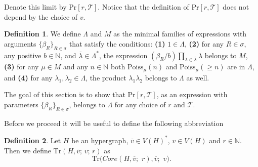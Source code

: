 \documentclass[12pt,notitlepage,a4paper]{article}
\theoremstyle{definition}
\newtheorem{definition}{Definition}[section]
\newcommand{\N}{\mathbb{N}}
\begin{document}
Denote this limit by $\mathrm{Pr}[r,\mathcal{T}]$. Notice that the 
definition of  $\mathrm{Pr}[r,\mathcal{T}]$ does not depend by the
choice of $v$.\par

\begin{definition} \label{def:treeprobabilies}
We define $\Lambda$ and $M$ as the minimal families
of expressions with arguments $\{\beta_R\}_{R\in\sigma}$
that satisfy the conditions: \textbf{(1)}
$1\in \Lambda$, \textbf{(2)} 
for any $R\in \sigma$, any positive $b\in \N$,
and $\overline{\lambda} \in \Lambda^*$,
the expression $(\beta_R/b) \prod_{\lambda\in \overline{\lambda}}
\lambda$
belongs to $M$, \textbf{(3)}
for any $\mu\in M$ and any $n\in \N$ both
$\mathrm{Poiss}_{\mu}(n)$ and $\mathrm{Poiss}_\mu(\geq n)$ are in $\Lambda$, 
and  \textbf{(4)} for any $\lambda_1,\lambda_2 \in \Lambda$, the
product $\lambda_1\lambda_2$ belongs to $\Lambda$ as well.
\end{definition}

The goal of this section is to show 
that $\mathrm{Pr}[r,\mathcal{T}]$,
as an expression with parameters
$\{\beta_R\}_{R\in\sigma}$, belongs to $\Lambda$ for any choice of 
$r$ and $\mathcal{T}$. \par

Before we proceed it will be useful to define the following abbreviation
\begin{definition} Let $H$ be an hypergraph, $\overline{v}\in V(H)^*$, $v\in V(H)$ and
	$r\in \N$. Then we define $\mathrm{Tr}(H,\overline{v};\, v;\, r)$ as
	\[
	\mathrm{Tr}\Big( Core(H,\overline{v};\,\,r),\overline{v}; \,\, v     \Big).
	\]
\end{definition}
\end{document}
